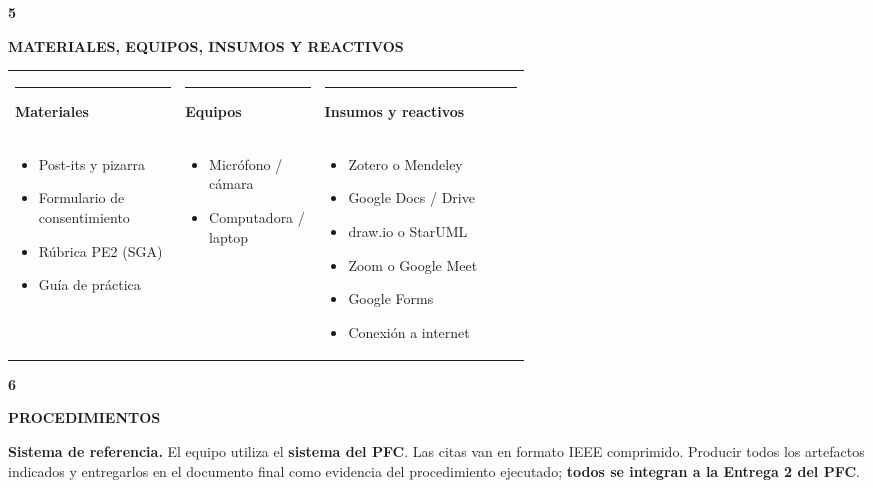 \documentclass[11pt,a4paper]{article}
\newcommand{\secband}[2]{%
  \par\vspace{9pt}\noindent
  {\setlength{\fboxsep}{0pt}%
   \colorbox{secdark}{\parbox[c][20pt][c]{0.05\textwidth}{\centering\textbf{\color{white}\small #1}}}%
   \colorbox{secblue}{\parbox[c][20pt][c]{0.95\textwidth}{\hspace{8pt}\textbf{\color{white}\small #2}}}%
  }\par\vspace{5pt}}
\newcommand{\submark}[1]{\par\vspace{4pt}\noindent
  {\color{secblue}\rule[-1pt]{3.5pt}{12pt}}\hspace{6pt}\textbf{\color{secdark}#1}\par\vspace{2pt}}
\begin{document}
\secband{5}{MATERIALES, EQUIPOS, INSUMOS Y REACTIVOS}
\noindent\begin{tabularx}{\linewidth}{@{}p{0.33\linewidth} p{0.27\linewidth} X@{}}
\submark{Materiales} & \submark{Equipos} & \submark{Insumos y reactivos}\\[2pt]
\begin{minipage}[t]{\linewidth}\vspace{-6pt}
\begin{itemize}
\item Post-its y pizarra
\item Formulario de consentimiento
\item Rúbrica PE2 (SGA)
\item Guía de práctica
\end{itemize}\end{minipage}
&
\begin{minipage}[t]{\linewidth}\vspace{-6pt}
\begin{itemize}
\item Micrófono / cámara
\item Computadora / laptop
\end{itemize}\end{minipage}
&
\begin{minipage}[t]{\linewidth}\vspace{-6pt}
\begin{itemize}
\item Zotero o Mendeley
\item Google Docs / Drive
\item draw.io o StarUML
\item Zoom o Google Meet
\item Google Forms
\item Conexión a internet
\end{itemize}\end{minipage}\\
\end{tabularx}

\secband{6}{PROCEDIMIENTOS}
\textbf{Sistema de referencia.} El equipo utiliza el \textbf{sistema del PFC}. Las citas van en formato IEEE comprimido. Producir todos los artefactos indicados y entregarlos en el documento final como evidencia del procedimiento ejecutado; \textbf{todos se integran a la Entrega 2 del PFC}.
\end{document}
